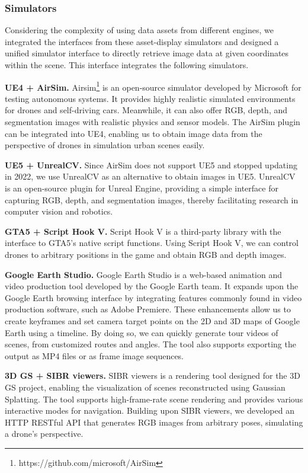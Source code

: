 \subsubsection{Simulators}

\indent \indent Considering the complexity of using data assets from different engines, we integrated the interfaces from these asset-display simulators and designed a unified simulator interface to directly retrieve image data at given coordinates within the scene. This interface integrates the following simulators.

\textbf{UE4 + AirSim.} Airsim\footnote{https://github.com/microsoft/AirSim} is an open-source simulator developed by Microsoft for testing autonomous systems. It provides highly realistic simulated environments for drones and self-driving cars. Meanwhile, it can also offer RGB, depth, and segmentation images with realistic physics and sensor models. The AirSim plugin can be integrated into UE4, enabling us to obtain image data from the perspective of drones in simulation urban scenes easily.

\textbf{UE5 + UnrealCV.} Since AirSim does not support UE5 and stopped updating in 2022, we use UnrealCV\cite{unrealcv} as an alternative to obtain images in UE5. UnrealCV is an open-source plugin for Unreal Engine, providing a simple interface for capturing RGB, depth, and segmentation images, thereby facilitating research in computer vision and robotics.

\textbf{GTA5 + Script Hook V.} Script Hook V is a third-party library with the interface to GTA5's native script functions. Using Script Hook V, we can control drones to arbitrary positions in the game and obtain RGB and depth images.

\textbf{Google Earth Studio.}
Google Earth Studio is a web-based animation and video production tool developed by the Google Earth team. It expands upon the Google Earth browsing interface by integrating features commonly found in video production software, such as Adobe Premiere. These enhancements allow us to create keyframes and set camera target points on the 2D and 3D maps of Google Earth using a timeline. By doing so, we can quickly generate tour videos of scenes, from customized routes and angles. The tool also supports exporting the output as MP4 files or as frame image sequences.

\textbf{3D GS + SIBR viewers.} SIBR\cite{sibr2020} viewers is a rendering tool designed for the 3D GS project, enabling the visualization of scenes reconstructed using Gaussian Splatting. The tool supports high-frame-rate scene rendering and provides various interactive modes for navigation. Building upon SIBR viewers, we developed an HTTP RESTful API that generates RGB images from arbitrary poses, simulating a drone's perspective.




